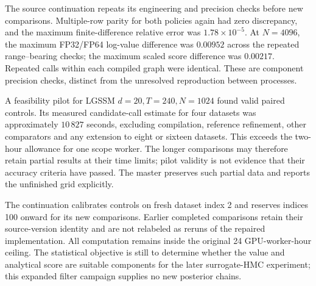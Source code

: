 The source continuation repeats its engineering and precision checks before
new comparisons. Multiple-row parity for both policies again had zero
discrepancy, and the maximum finite-difference relative error was
$1.78\times10^{-5}$. At $N=4096$, the maximum FP32/FP64 log-value difference
was $0.00952$ across the repeated range--bearing checks; the maximum scaled
score difference was $0.00217$. Repeated calls within each compiled graph
were identical. These are component precision checks, distinct from the
unresolved reproduction between processes.

A feasibility pilot for LGSSM $d=20,T=240,N=1024$ found valid paired controls.
Its measured candidate-call estimate for four datasets was approximately
$10\,827$ seconds, excluding compilation, reference refinement, other
comparators and any extension to eight or sixteen datasets. This exceeds
the two-hour allowance for one scope worker. The longer comparisons may
therefore retain partial results at their time limits; pilot validity is
not evidence that their accuracy criteria have passed. The master preserves
such partial data and reports the unfinished grid explicitly.

The continuation calibrates controls on fresh dataset index 2 and reserves
indices 100 onward for its new comparisons. Earlier completed comparisons
retain their source-version identity and are not relabeled as reruns of the
repaired implementation. All computation remains inside the original
24 GPU-worker-hour ceiling. The statistical objective is still to determine
whether the value and analytical score are suitable components for the later
surrogate-HMC experiment; this expanded filter campaign supplies no new
posterior chains.
